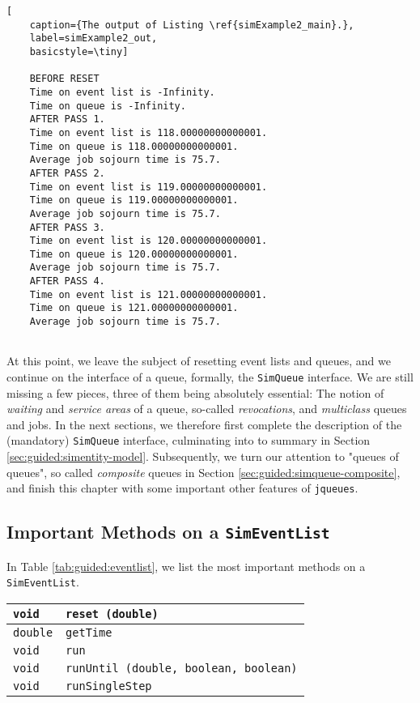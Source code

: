 \begin{lstfloat}
	\begin{lstlisting}[
	caption={The output of Listing \ref{simExample2_main}.},
	label=simExample2_out,
	basicstyle=\tiny]
	
	BEFORE RESET
	Time on event list is -Infinity.
	Time on queue is -Infinity.
	AFTER PASS 1.
	Time on event list is 118.00000000000001.
	Time on queue is 118.00000000000001.
	Average job sojourn time is 75.7.
	AFTER PASS 2.
	Time on event list is 119.00000000000001.
	Time on queue is 119.00000000000001.
	Average job sojourn time is 75.7.
	AFTER PASS 3.
	Time on event list is 120.00000000000001.
	Time on queue is 120.00000000000001.
	Average job sojourn time is 75.7.
	AFTER PASS 4.
	Time on event list is 121.00000000000001.
	Time on queue is 121.00000000000001.
	Average job sojourn time is 75.7.
	
	\end{lstlisting}
\end{lstfloat}

At this point,
we leave the subject of resetting event lists and queues,
and we continue on the interface of a queue,
formally, the \lstinline|SimQueue| interface.
We are still missing a few pieces,
three of them being absolutely essential:
The notion of {\em waiting\/} and {\em service areas\/}
of a queue, so-called {\em revocations},
and {\em multiclass\/} queues and jobs.
In the next sections,
we therefore first complete the description of the (mandatory)
\lstinline|SimQueue| interface,
culminating into to summary
in Section \ref{sec:guided:simentity-model}.
Subsequently,
we turn our attention to "queues of queues",
so called {\em composite\/} queues in Section \ref{sec:guided:simqueue-composite},
and finish this chapter with
some important other features of \lstinline|jqueues|.

\subsection{Important Methods on a \texttt{SimEventList}}

In Table \ref{tab:guided:eventlist},
we list the most important methods
on a \lstinline|SimEventList|.

\begin{table}[h]
	\label{tab:guided:eventlist}
	\caption{Important methods on a \texttt{SimEventList}.}
	\begin{longtabu}{|l|l|}
		\hline
		\lstinline|void|   & \lstinline|reset (double)|
		\\ \hline
		\lstinline|double| & \lstinline|getTime|
		\\ \hline
		\lstinline|void|   & \lstinline|run|
		\\ \hline
		\lstinline|void|   & \lstinline|runUntil (double, boolean, boolean)|
		\\ \hline
		\lstinline|void|   & \lstinline|runSingleStep|
		\\ \hline
	\end{longtabu}
\end{table}


